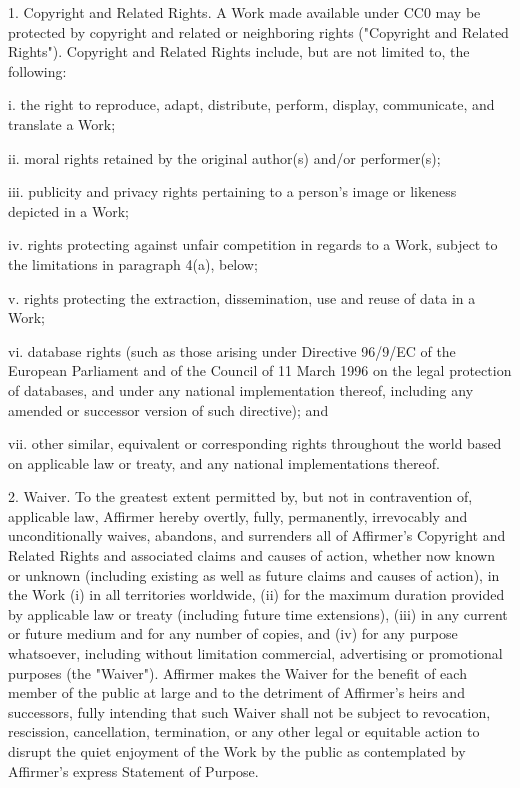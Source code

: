 \documentclass[a4paper,12pt]{article}
\begin{document}
\begin{appendices}
1. Copyright and Related Rights. A Work made available under CC0 may be
protected by copyright and related or neighboring rights ("Copyright and
Related Rights"). Copyright and Related Rights include, but are not
limited to, the following:

  i. the right to reproduce, adapt, distribute, perform, display,
     communicate, and translate a Work;
     
 ii. moral rights retained by the original author(s) and/or performer(s);
 
iii. publicity and privacy rights pertaining to a person's image or
     likeness depicted in a Work;
     
 iv. rights protecting against unfair competition in regards to a Work,
     subject to the limitations in paragraph 4(a), below;
     
  v. rights protecting the extraction, dissemination, use and reuse of data in a Work;
  
 vi. database rights (such as those arising under Directive 96/9/EC of the
     European Parliament and of the Council of 11 March 1996 on the legal
     protection of databases, and under any national implementation
     thereof, including any amended or successor version of such
     directive); and
     
vii. other similar, equivalent or corresponding rights throughout the
     world based on applicable law or treaty, and any national
     implementations thereof.

2. Waiver. To the greatest extent permitted by, but not in contravention
of, applicable law, Affirmer hereby overtly, fully, permanently,
irrevocably and unconditionally waives, abandons, and surrenders all of
Affirmer's Copyright and Related Rights and associated claims and causes
of action, whether now known or unknown (including existing as well as
future claims and causes of action), in the Work (i) in all territories
worldwide, (ii) for the maximum duration provided by applicable law or
treaty (including future time extensions), (iii) in any current or future
medium and for any number of copies, and (iv) for any purpose whatsoever,
including without limitation commercial, advertising or promotional
purposes (the "Waiver"). Affirmer makes the Waiver for the benefit of each
member of the public at large and to the detriment of Affirmer's heirs and
successors, fully intending that such Waiver shall not be subject to
revocation, rescission, cancellation, termination, or any other legal or
equitable action to disrupt the quiet enjoyment of the Work by the public
as contemplated by Affirmer's express Statement of Purpose.


\end{appendices}
\end{document}
